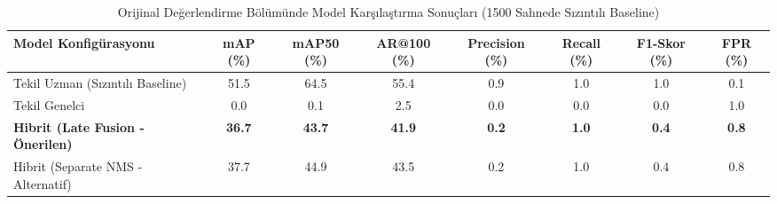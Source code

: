 \begin{table}[htbp]
\caption{Orijinal Değerlendirme Bölümünde Model Karşılaştırma Sonuçları (1500 Sahnede Sızıntılı Baseline)}
\label{tab:model_comparison_1500}
\centering
\begin{tabular}{lccccccc}
\hline
\textbf{Model Konfigürasyonu} & \textbf{mAP (\%)} & \textbf{mAP50 (\%)} & \textbf{AR@100 (\%)} & \textbf{Precision (\%)} & \textbf{Recall (\%)} & \textbf{F1-Skor (\%)} & \textbf{FPR (\%)} \\ \hline
Tekil Uzman (Sızıntılı Baseline) & 51.5 & 64.5 & 55.4 & 0.9 & 1.0 & 1.0 & 0.1 \\
Tekil Genelci & 0.0 & 0.1 & 2.5 & 0.0 & 0.0 & 0.0 & 1.0 \\
\textbf{Hibrit (Late Fusion - Önerilen)} & \textbf{36.7} & \textbf{43.7} & \textbf{41.9} & \textbf{0.2} & \textbf{1.0} & \textbf{0.4} & \textbf{0.8} \\
Hibrit (Separate NMS - Alternatif) & 37.7 & 44.9 & 43.5 & 0.2 & 1.0 & 0.4 & 0.8 \\
\hline
\end{tabular}
\end{table}
